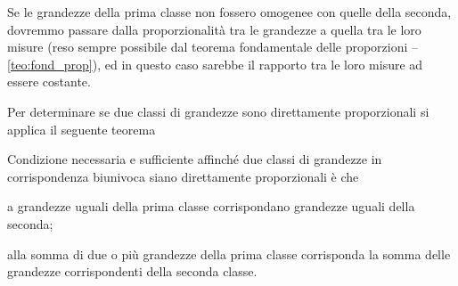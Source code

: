 Se le grandezze della prima classe non fossero omogenee con quelle 
della seconda, dovremmo passare dalla proporzionalità tra le 
grandezze a quella tra le loro misure (reso sempre possibile dal 
teorema fondamentale delle proporzioni -- \ref{teo:fond_prop}), ed in 
questo caso sarebbe il rapporto tra le loro misure ad essere costante.

Per determinare se due classi di grandezze sono direttamente 
proporzionali si applica il seguente teorema
\begin{teorema}\label{teo:6.1}
Condizione necessaria e sufficiente affinché due classi di grandezze 
in corrispondenza biunivoca siano direttamente proporzionali è che
\begin{itemize*}
\item a grandezze uguali della prima classe corrispondano grandezze 
uguali della seconda;
\item alla somma di due o più grandezze della prima classe 
corrisponda la somma delle grandezze corrispondenti della seconda 
classe.
\end{itemize*}
\end{teorema}

